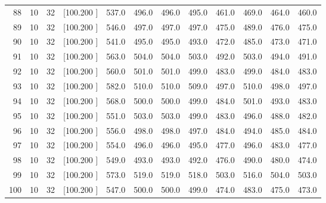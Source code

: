 \documentclass[12pt,a4paper]{article}
\begin{document}
\begin{center}
{\begin{tabular}{r r r r r r r r r r r r}
  88& 10& 32&[100.200   ]&   537.0&   496.0&   496.0&   495.0&   461.0&   469.0&   464.0&   460.0\\[-0.02in]
  89& 10& 32&[100.200   ]&   546.0&   497.0&   497.0&   497.0&   475.0&   489.0&   476.0&   475.0\\[-0.02in]
  90& 10& 32&[100.200   ]&   541.0&   495.0&   495.0&   493.0&   472.0&   485.0&   473.0&   471.0\\[-0.02in]
  91& 10& 32&[100.200   ]&   563.0&   504.0&   504.0&   503.0&   492.0&   503.0&   494.0&   491.0\\[-0.02in]
  92& 10& 32&[100.200   ]&   560.0&   501.0&   501.0&   499.0&   483.0&   499.0&   484.0&   483.0\\[-0.02in]
  93& 10& 32&[100.200   ]&   582.0&   510.0&   510.0&   509.0&   497.0&   510.0&   498.0&   497.0\\[-0.02in]
  94& 10& 32&[100.200   ]&   568.0&   500.0&   500.0&   499.0&   484.0&   501.0&   493.0&   483.0\\[-0.02in]
  95& 10& 32&[100.200   ]&   551.0&   503.0&   503.0&   499.0&   483.0&   496.0&   488.0&   482.0\\[-0.02in]
  96& 10& 32&[100.200   ]&   556.0&   498.0&   498.0&   497.0&   484.0&   494.0&   485.0&   484.0\\[-0.02in]
  97& 10& 32&[100.200   ]&   554.0&   496.0&   496.0&   495.0&   477.0&   496.0&   483.0&   477.0\\[-0.02in]
  98& 10& 32&[100.200   ]&   549.0&   493.0&   493.0&   492.0&   476.0&   490.0&   480.0&   474.0\\[-0.02in]
  99& 10& 32&[100.200   ]&   573.0&   519.0&   519.0&   518.0&   503.0&   516.0&   504.0&   503.0\\[-0.02in]
 100& 10& 32&[100.200   ]&   547.0&   500.0&   500.0&   499.0&   474.0&   483.0&   475.0&   473.0\\[-0.02in]

\hline
\end{tabular}}
\end{center}
\end{document}
